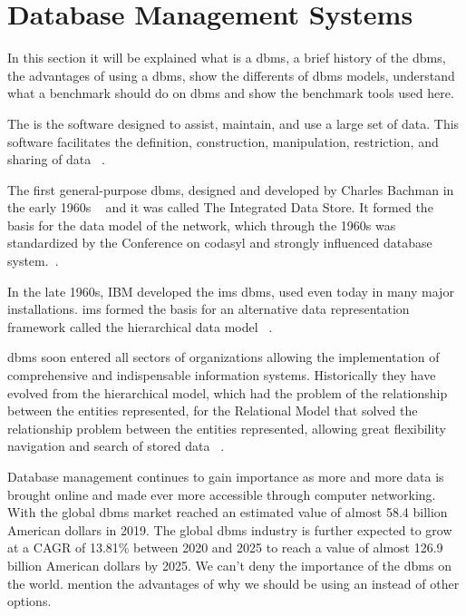 \section{Database Management Systems}

In this section it will be explained what is a \gls{dbms}, a brief history of the \gls{dbms}, the advantages of using a \gls{dbms}, show the differents of  \gls{dbms} models, understand what a benchmark should do on \gls{dbms} and show the benchmark tools used here.

The  is the software designed to assist, maintain, and use a large set of data. This software facilitates the definition, construction, manipulation, restriction, and sharing of data ~\cite{gehrke_2002}. 

The first general-purpose \gls{dbms}, designed and developed by Charles Bachman in the early 1960s ~\cite{haigh2016charles} and it was called The Integrated Data Store. It formed the basis for the data model of the network, which through the 1960s was standardized by the Conference on \gls{codasyl} and strongly influenced database system.~\cite{gehrke_2002,haigh2016charles}.

In the late 1960s, IBM developed the \gls{ims} \gls{dbms}, used even today in many major installations. \gls{ims} formed the basis for an alternative data representation framework called the hierarchical data model ~\cite{gehrke_2002}. 

\gls{dbms} soon entered all sectors of organizations allowing the implementation of comprehensive and indispensable information systems. Historically they have evolved from the hierarchical model, which had the problem of the relationship between the entities represented, for the Relational Model that solved the relationship problem between the entities represented, allowing great flexibility navigation and search of stored data ~\cite{gehrke_2002}.

Database management continues to gain importance as more and more data is
brought online and made ever more accessible through computer networking. With the global \gls{dbms} market reached an estimated value of almost 58.4 billion American dollars in 2019. The global \gls{dbms} industry is further expected to grow at a CAGR of 13.81\% between 2020 and 2025 to reach a value of almost 126.9 billion American dollars by 2025. We can't deny the importance of the \gls{dbms} on the world. mention the advantages of why we should be using an instead of other options.

